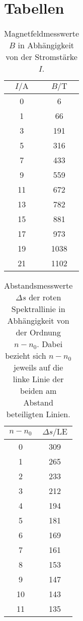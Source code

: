 \appendix

\section{Tabellen}

\begin{table}[H]
  \centering
  \caption{Magnetfeldmesswerte $B$ in Abhängigkeit von der Stromstärke $I$.}
  \begin{tabular}{S[table-format=2.0] S[table-format=4.0]}
    \toprule
    {$I/\si{\ampere}$} & {$B/\si{\tesla}$}\\
      & 6    \\
    1  & 66   \\
    3  & 191  \\
    5  & 316  \\
    7  & 433  \\
    9  & 559  \\
    11 & 672  \\
    13 & 782  \\
    15 & 881  \\
    17 & 973  \\
    19 & 1038 \\
    21 & 1102 \\
    \bottomrule
  \end{tabular}
  \label{tab:kalib}
\end{table}

\begin{table}[H]
  \centering
  \caption{Abstandsmesswerte $\Delta s$ der roten Spektrallinie in Abhängigkeit von der Ordnung $n-n_0$.
  Dabei bezieht sich $n-n_0$ jeweils auf die linke Linie der beiden am Abstand beteiligten Linien.}
  \begin{tabular}{S[table-format=2.0] S[table-format=3.0]}
    \toprule
    {$n-n_0$} & {$\Delta s/\text{LE}$}\\
      & 309 \\
    1  & 265 \\
    2  & 233 \\
    3  & 212 \\
    4  & 194 \\
    5  & 181 \\
    6  & 169 \\
    7  & 161 \\
    8  & 153 \\
    9  & 147 \\
    10 & 143 \\
    11 & 135 \\
    \bottomrule
  \end{tabular}
  \label{tab:redB0}
\end{table}

